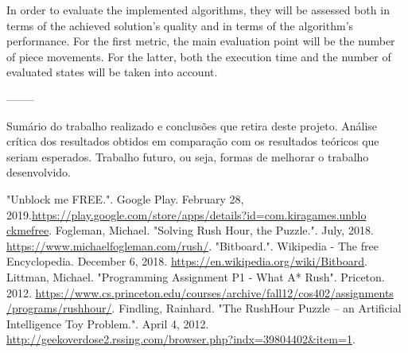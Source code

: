 \documentclass[conference]{IEEEtran}
\begin{document}
In order to evaluate the implemented algorithms, they will be assessed both in terms of the achieved solution's quality and in terms of the algorithm's performance. For the first metric, the main evaluation point will be the number of piece movements. For the latter, both the execution time and the number of evaluated states will be taken into account.

--------

Sumário do trabalho realizado e conclusões que retira deste projeto. Análise crítica dos resultados obtidos em comparação com os resultados teóricos que seriam esperados. Trabalho futuro, ou seja, formas de melhorar o trabalho desenvolvido.

\begin{thebibliography}{00}
    
 "Unblock me FREE.". Google Play. February 28, 2019.\href{https://play.google.com/store/apps/details?id=com.kiragames.unblockmefree}{https://play.google.com/store/apps/details?id=com.kiragames.unblo\\ckmefree}.
 Fogleman, Michael. "Solving Rush Hour, the Puzzle.". July, 2018. \href{https://www.michaelfogleman.com/rush/}{https://www.michaelfogleman.com/rush/}.
 "Bitboard.". Wikipedia - The free Encyclopedia. December 6, 2018. \href{https://en.wikipedia.org/wiki/Bitboard}{https://en.wikipedia.org/wiki/Bitboard}.
 Littman, Michael. "Programming Assignment P1 - What A* Rush". Priceton. 2012. \href{https://www.cs.princeton.edu/courses/archive/fall12/cos402/assignments/programs/rushhour/}{https://www.cs.princeton.edu/courses/archive/fall12/cos402/assignments\\/programs/rushhour/}.
 Findling, Rainhard. "The RushHour Puzzle – an Artificial Intelligence Toy Problem.". April 4, 2012. \href{http://geekoverdose2.rssing.com/browser.php?indx=39804402\&item=1}{http://geekoverdose2.rssing.com/browser.php?indx=39804402\&item=1}.
\end{thebibliography}
\end{document}
